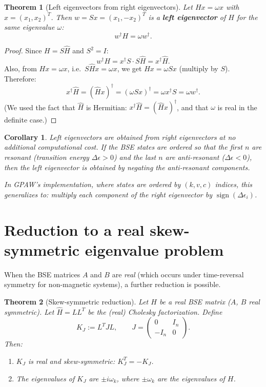 \documentclass[11pt]{article}
\newtheorem{theorem}{Theorem}
\newtheorem{corollary}{Corollary}
\newcommand{\bmat}[1]{\begin{pmatrix}#1\end{pmatrix}}
\newcommand{\hc}{\dagger}
\newcommand{\Hhat}{\widehat{H}}
\begin{document}
\begin{theorem}[Left eigenvectors from right eigenvectors]%
  \label{thm:left}
  Let $Hx = \omega x$ with $x = (x_1, x_2)^T$.  Then
  $w = Sx = (x_1, -x_2)^T$ is a \textbf{left eigenvector} of $H$
  for the same eigenvalue $\omega$:
  \begin{equation}\label{eq:left}
    \boxed{w^\hc H = \omega w^\hc.}
  \end{equation}
\end{theorem}

\begin{proof}
  Since $H = S\Hhat$ and $S^2 = I$:
  \[
    w^\hc H = x^\hc S \cdot S \Hhat = x^\hc \Hhat.
  \]
  Also, from $Hx = \omega x$, i.e.\ $S\Hhat x = \omega x$, we get
  $\Hhat x = \omega S x$ (multiply by $S$).  Therefore:
  \[
    x^\hc \Hhat = (\Hhat x)^\hc = (\omega S x)^\hc = \omega x^\hc S = \omega w^\hc.
  \]
  (We used the fact that $\Hhat$ is Hermitian: $x^\hc \Hhat
  = (\Hhat x)^\hc$, and that $\omega$ is real in the definite case.)
\end{proof}

\begin{corollary}
  Left eigenvectors are obtained from right eigenvectors at no
  additional computational cost.  If the BSE states are ordered so
  that the first $n$ are resonant (transition energy $\Delta\epsilon > 0$)
  and the last $n$ are anti-resonant ($\Delta\epsilon < 0$), then the
  left eigenvector is obtained by negating the anti-resonant
  components.

  In GPAW's implementation, where states are ordered by
  $(k, v, c)$ indices, this generalizes to: multiply each component of
  the right eigenvector by $\operatorname{sign}(\Delta\epsilon_i)$.
\end{corollary}


\section{Reduction to a real skew-symmetric eigenvalue problem}
\label{sec:skewsymm}

When the BSE matrices $A$ and $B$ are \emph{real} (which occurs under
time-reversal symmetry for non-magnetic systems), a further reduction
is possible.

\begin{theorem}[Skew-symmetric reduction]\label{thm:skew}
  Let $H$ be a real BSE matrix ($A$, $B$ real symmetric).
  Let $\Hhat = LL^T$ be the (real) Cholesky factorization.  Define
  \begin{equation}
    K_J := L^T J L, \qquad J = \bmat{0 & I_n \\ -I_n & 0}.
  \end{equation}
  Then:
  \begin{enumerate}
    \item $K_J$ is real and skew-symmetric: $K_J^T = -K_J$.
    \item The eigenvalues of $K_J$ are $\pm i\omega_k$, where
      $\pm\omega_k$ are the eigenvalues of $H$.
  \end{enumerate}
\end{theorem}
\end{document}
